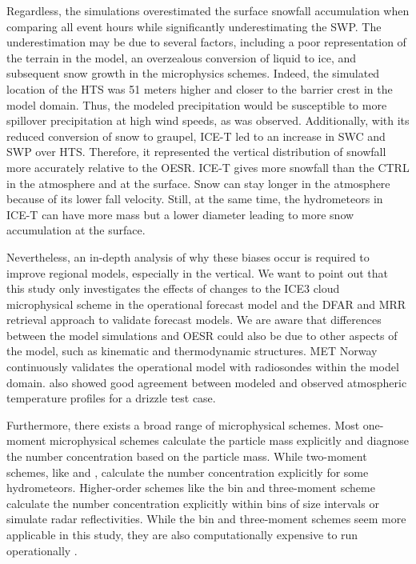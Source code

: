 \documentclass{ametsocV5}
\begin{document}
		Regardless, the simulations overestimated the surface snowfall accumulation when comparing all event hours while significantly underestimating the SWP. The underestimation may be due to several factors, including a poor representation of the terrain in the model, an overzealous conversion of liquid to ice, and subsequent snow growth in the microphysics schemes. Indeed, the simulated location of the HTS was 51 meters higher and closer to the barrier crest in the model domain. Thus, the modeled precipitation would be susceptible to more spillover precipitation at high wind speeds, as was observed. Additionally, with its reduced conversion of snow to graupel, ICE-T led to an increase in SWC and SWP over HTS. Therefore, it represented the vertical distribution of snowfall more accurately relative to the OESR. ICE-T gives more snowfall than the CTRL in the atmosphere and at the surface. Snow can stay longer in the atmosphere because of its lower fall velocity. Still, at the same time, the hydrometeors in ICE-T can have more mass but a lower diameter leading to more snow accumulation at the surface.  

		Nevertheless, an in-depth analysis of why these biases occur is required to improve regional models, especially in the vertical. We want to point out that this study only investigates the effects of changes to the ICE3 cloud microphysical scheme in the operational forecast model and the DFAR and MRR retrieval approach to validate forecast models. We are aware that differences between the model simulations and OESR could also be due to other aspects of the model, such as kinematic and thermodynamic structures. MET Norway continuously validates the operational model with radiosondes within the model domain. \citet{engdahl_effects_2020} also showed good agreement between modeled and observed atmospheric temperature profiles for a drizzle test case.
		
		Furthermore, there exists a broad range of microphysical schemes. Most one-moment microphysical schemes calculate the particle mass explicitly and diagnose the number concentration based on the particle mass. While two-moment schemes, like \citet{thompson_explicit_2008} and \citet{morrison_impact_2009}, calculate the number concentration explicitly for some hydrometeors.  Higher-order schemes like the bin and three-moment scheme calculate the number concentration explicitly within bins of size intervals or simulate radar reflectivities. While the bin and three-moment schemes seem more applicable in this study, they are also computationally expensive to run operationally \citep{morrison_impact_2009}. 
\end{document}

